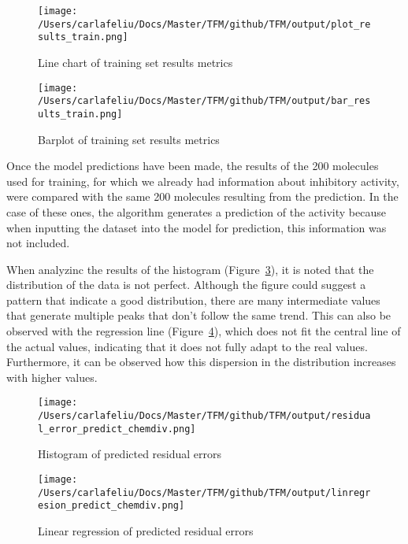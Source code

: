 \documentclass[final,times,twocolumn,article]{elsarticle}
\begin{document}
 \begin{figure}[ht]
     \centering 
      \texttt{[image: /Users/carlafeliu/Docs/Master/TFM/github/TFM/output/plot\_results\_train.png]}	
      \caption{Line chart of training set results metrics} 
      \label{Figure2}
  \end{figure}
 
  \begin{figure}[ht]
     \centering 
      \texttt{[image: /Users/carlafeliu/Docs/Master/TFM/github/TFM/output/bar\_results\_train.png]}	
      \caption{Barplot of training set results metrics} 
      \label{Figure3}
  \end{figure}

Once the model predictions have been made, the results of the 200 molecules used for training, for which we already had information about inhibitory activity, were compared with the same 200 molecules resulting from the prediction. In the case of these ones, the algorithm generates a prediction of the activity because when inputting the dataset into the model for prediction, this information was not included. 

When analyzinc the results of the histogram (Figure~\ref{Figure4}), it is noted that the distribution of the data is not perfect. Although the figure could suggest a pattern that indicate a good distribution, there are many intermediate values that generate multiple peaks that don't follow the same trend. This can also be observed with the regression line (Figure~\ref{Figure5}), which does not fit the central line of the actual values, indicating that it does not fully adapt to the real values. Furthermore, it can be observed how this dispersion in the distribution increases with higher values. 

\begin{figure}[ht]
    \centering 
     \texttt{[image: /Users/carlafeliu/Docs/Master/TFM/github/TFM/output/residual\_error\_predict\_chemdiv.png]}	
     \caption{Histogram of predicted residual errors} 
     \label{Figure4}
 \end{figure}

 \begin{figure}[ht]
    \centering 
     \texttt{[image: /Users/carlafeliu/Docs/Master/TFM/github/TFM/output/linregresion\_predict\_chemdiv.png]}	
     \caption{Linear regression of predicted residual errors} 
     \label{Figure5}
 \end{figure}
\end{document}

